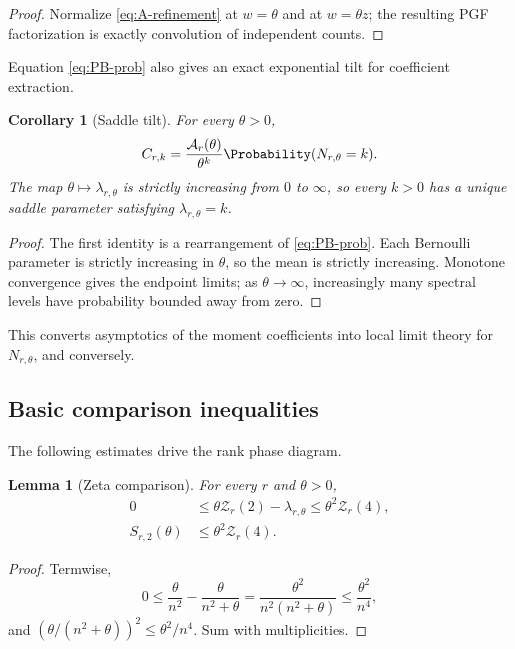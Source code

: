 \documentclass[11pt,oneside]{article}
\newtheorem{lemma}[theorem]{Lemma}
\newtheorem{corollary}[theorem]{Corollary}
\theoremstyle{definition}
\theoremstyle{remark}
\newcommand{\ZetaR}{\mathcal Z}
\newcommand{\Ar}{\mathcal A}
\begin{document}
\begin{proof}
Normalize \eqref{eq:A-refinement} at $w=\theta$ and at $w=\theta z$; the
resulting PGF factorization is exactly convolution of independent counts.
\end{proof}

Equation \eqref{eq:PB-prob} also gives an exact exponential tilt for
coefficient extraction.

\begin{corollary}[Saddle tilt]\label{cor:saddle-tilt}
For every $\theta>0$,
\begin{equation}\label{eq:saddle-tilt}
 C_{r,k}=\frac{\Ar_r(\theta)}{\theta^k}
 \Probability(N_{r,\theta}=k).
\end{equation}
The map $\theta\mapsto\lambda_{r,\theta}$ is strictly increasing from $0$ to
$\infty$, so every $k>0$ has a unique saddle parameter satisfying
$\lambda_{r,\theta}=k$.
\end{corollary}

\begin{proof}
The first identity is a rearrangement of \eqref{eq:PB-prob}.  Each Bernoulli
parameter is strictly increasing in $\theta$, so the mean is strictly
increasing.  Monotone convergence gives the endpoint limits; as
$\theta\to\infty$, increasingly many spectral levels have probability bounded
away from zero.
\end{proof}

This converts asymptotics of the moment coefficients into local limit theory
for $N_{r,\theta}$, and conversely.

\subsection{Basic comparison inequalities}

The following estimates drive the rank phase diagram.

\begin{lemma}[Zeta comparison]\label{lem:PB-bounds}
For every $r$ and $\theta>0$,
\begin{align}
 0&\leq \theta\ZetaR_r(2)-\lambda_{r,\theta}
 \leq\theta^2\ZetaR_r(4),\label{eq:mean-bound}\\
 S_{r,2}(\theta)&\leq\theta^2\ZetaR_r(4).\label{eq:S2-bound}
\end{align}
\end{lemma}

\begin{proof}
Termwise,
\[
 0\leq\frac{\theta}{n^2}-\frac{\theta}{n^2+\theta}
 =\frac{\theta^2}{n^2(n^2+\theta)}\leq\frac{\theta^2}{n^4},
\]
and
$(\theta/(n^2+\theta))^2\leq\theta^2/n^4$.
Sum with multiplicities.
\end{proof}
\end{document}
